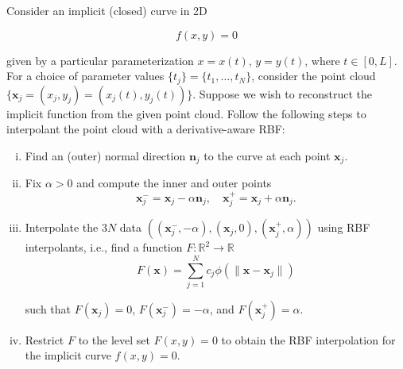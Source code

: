 Consider an implicit (closed) curve in 2D

$$
f(x, y) = 0
$$

given by a particular parameterization $x = x(t)$, $y = y(t)$, where $t \in [0, L]$. For a choice of parameter values
$\{t_j\} = \{t_1, \dots, t_N\}$, consider the point cloud 
$\{ \bm{x}_j = \left( x_j, y_j \right) = \left( x_j(t), y_j(t) \right) \}$. Suppose we wish to reconstruct the implicit 
function from the given point cloud. Follow the following steps to interpolant the point cloud with a derivative-aware 
RBF:


\begin{enumerate}[(i)]
  \item Find an (outer) normal direction $\bm{n}_j$ to the curve at each point $\bm{x}_j$.
  \item Fix $\alpha > 0$ and compute the inner and outer points
        $$
          \bm{x}_j^- = \bm{x}_j - \alpha \bm{n}_j, \quad \bm{x}_j^+ = \bm{x}_j + \alpha \bm{n}_j.
        $$
  \item Interpolate the $3N$ data $\left( (\bm{x}_j^-, -\alpha), (\bm{x}_j, 0), (\bm{x}_j^+, \alpha) \right)$ using RBF interpolants, i.e., find a function $F: \mathbb{R}^2 \to \mathbb{R}$
        $$
          F(\bm{x}) = \sum\limits_{j=1}^{N} c_j \phi \left( \lVert \bm{x} - \bm{x}_j \rVert \right)
        $$

        such that $F(\bm{x}_j) = 0$, $F(\bm{x}_j^-) = -\alpha$, and $F(\bm{x}_j^+) = \alpha$.
  \item Restrict $F$ to the level set $F(x, y) = 0$ to obtain the RBF interpolation for the implicit curve $f(x, y) = 0$.
\end{enumerate}

